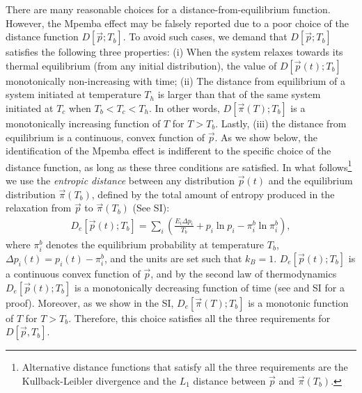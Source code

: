 \documentclass[a4paper,draft,aps,prl,preprint,superscriptaddress,nofootinbib]{revtex4}
\begin{document}
		There are many reasonable choices for a distance-from-equilibrium function. However, the Mpemba effect may be falsely reported due to a poor choice of the distance function $D[\vec p;T_b]$. To avoid such cases, we demand that $D[\vec p;T_b]$ satisfies the following three properties: (i) When the system relaxes towards its thermal equilibrium (from any initial distribution), the value of $D[\vec p(t);T_b]$ monotonically non-increasing with time;  (ii) The distance from equilibrium of a system initiated at temperature $T_h$ is larger than that of the same system initiated at $T_c$ when $T_b<T_c<T_h$. In other words, $D[\vec \pi (T);T_b]$ is a monotonically increasing function of $T$ for $T>T_b$.  Lastly, (iii) the distance from equilibrium is a continuous, convex function of $\vec p$. As we show below, the identification of the  Mpemba effect is indifferent to the specific choice of the distance function, as long as these three conditions are satisfied. In what follows\footnote{Alternative distance functions that satisfy all the three requirements are the Kullback-Leibler divergence and the $L_1$ distance between $\vec p$ and $\vec \pi (T_b)$. } we use the {\it entropic distance} between any distribution $\vec p(t)$ and the equilibrium distribution $\vec\pi(T_b)$, defined by the total amount of entropy produced in the relaxation from $\vec p$ to $\vec \pi(T_b)$ (See SI):
		\begin{align}\label{Eq:DistFromEq}
		D_e[\vec p(t);T_b] =\sum_{i}\left(\frac{E_i \Delta p_i}{T_b}  +p_i\ln p_i-\pi^b_i\ln\pi^b_i\right), 
		\end{align}
		where $\pi^b_i$ denotes the equilibrium probability at temperature $T_b$, $\Delta p_i(t)=p_i(t)-\pi^b_i$, and the units are set such that $k_B=1$.  $D_e[\vec p(t);T_b]$ is a continuous convex function of $\vec p$, and by the second law of thermodynamics $D_e[\vec p(t);T_b]$ is a monotonically decreasing function of time (see \cite{seifert_review_2012} and SI for a proof). Moreover, as we show in the SI, $D_e[\vec \pi (T);T_b]$ is a monotonic function of $T$ for $T>T_b$. Therefore, this choice satisfies all the three requirements for $D[\vec p,T_b]$. 
		
		
				
\end{document}
